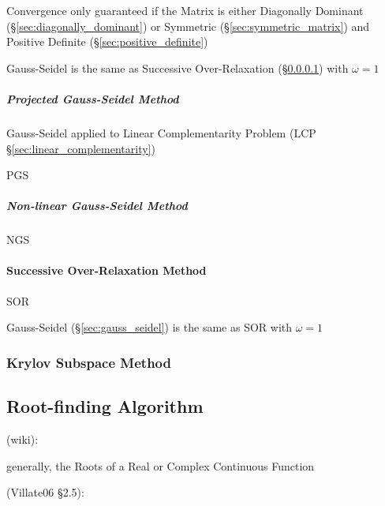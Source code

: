Convergence only guaranteed if the Matrix is either Diagonally
Dominant (\S\ref{sec:diagonally_dominant}) or Symmetric
(\S\ref{sec:symmetric_matrix}) and Positive Definite
(\S\ref{sec:positive_definite})

Gauss-Seidel is the same as Successive Over-Relaxation
(\S\ref{sec:successive_over_relaxation}) with $\omega = 1$



\subparagraph{Projected Gauss-Seidel Method}\hfill
\label{sec:projected_gauss_seidel}

Gauss-Seidel applied to Linear Complementarity Problem (LCP
\S\ref{sec:linear_complementarity})

PGS



\subparagraph{Non-linear Gauss-Seidel Method}
\label{sec:nonlinear_gauss_seidel}

NGS



\paragraph{Successive Over-Relaxation Method}
\label{sec:successive_over_relaxation}\hfill

SOR

Gauss-Seidel (\S\ref{sec:gauss_seidel}) is the same as SOR with $\omega = 1$



\subsubsection{Krylov Subspace Method}\label{sec:krylov_subspace_method}



\subsection{Root-finding Algorithm}\label{sec:root_finding}

(wiki):

generally, the Roots of a Real or Complex Continuous Function

(Villate06 \S 2.5):

